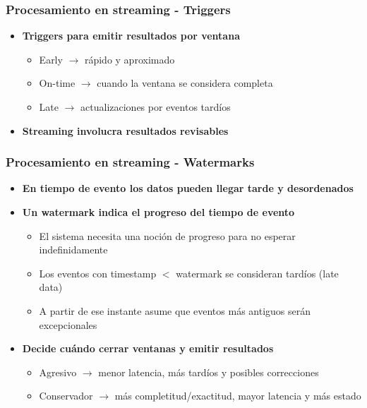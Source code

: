 \documentclass[aspectratio=169]{beamer}
\begin{document}
\begin{frame}
\frametitle{Procesamiento en streaming - Triggers}
\begin{itemize}

  \item \textbf{Triggers para emitir resultados por ventana}
  \begin{itemize}
    \item Early $\rightarrow$ rápido y aproximado
    \item On-time $\rightarrow$ cuando la ventana se considera completa
    \item Late $\rightarrow$ actualizaciones por eventos tardíos
  \end{itemize}

  \vspace{1em}

  \item \textbf{Streaming involucra resultados revisables}
\end{itemize}
\end{frame}


\begin{frame}
\frametitle{Procesamiento en streaming - Watermarks}
  \begin{itemize}
    \item \textbf{En tiempo de evento los datos pueden llegar tarde y desordenados}

    \vspace{1em}

    \item \textbf{Un watermark indica el progreso del tiempo de evento}
    \begin{itemize}
      \item El sistema necesita una noción de progreso para no esperar indefinidamente
      \item Los eventos con timestamp $<$ watermark se consideran tardíos (late data)
      \item A partir de ese instante asume que eventos más antiguos serán excepcionales
    \end{itemize}

    \vspace{1em}

    \item \textbf{Decide cuándo cerrar ventanas y emitir resultados}
    \begin{itemize}
      \item Agresivo $\rightarrow$ menor latencia, más tardíos y posibles correcciones
      \item Conservador $\rightarrow$ más completitud/exactitud, mayor latencia y más estado
    \end{itemize}
  \end{itemize}
\end{frame}
\end{document}
